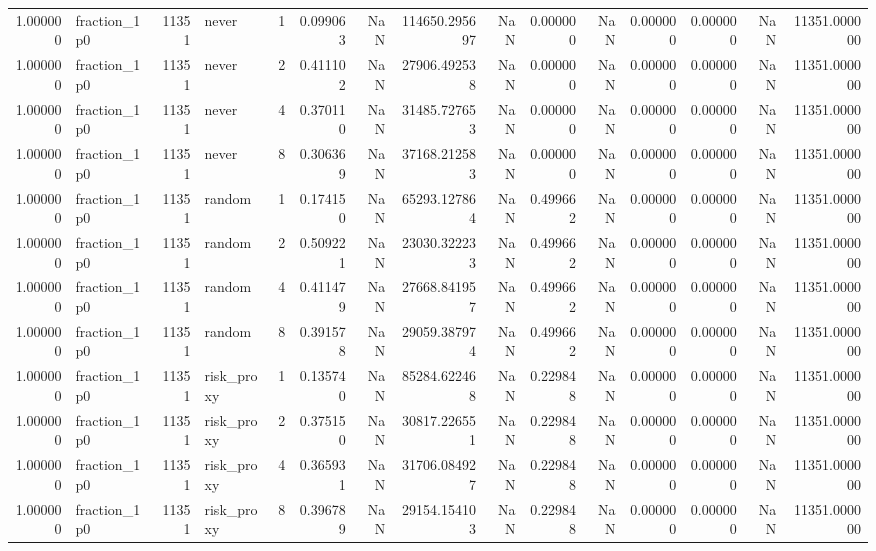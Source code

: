 \begin{tabular}{rlrlrrrrrrrrrrr}
1.000000 & fraction\_1p0 & 11351 & never & 1 & 0.099063 & NaN & 114650.295697 & NaN & 0.000000 & NaN & 0.000000 & 0.000000 & NaN & 11351.000000 \\
1.000000 & fraction\_1p0 & 11351 & never & 2 & 0.411102 & NaN & 27906.492538 & NaN & 0.000000 & NaN & 0.000000 & 0.000000 & NaN & 11351.000000 \\
1.000000 & fraction\_1p0 & 11351 & never & 4 & 0.370110 & NaN & 31485.727653 & NaN & 0.000000 & NaN & 0.000000 & 0.000000 & NaN & 11351.000000 \\
1.000000 & fraction\_1p0 & 11351 & never & 8 & 0.306369 & NaN & 37168.212583 & NaN & 0.000000 & NaN & 0.000000 & 0.000000 & NaN & 11351.000000 \\
1.000000 & fraction\_1p0 & 11351 & random & 1 & 0.174150 & NaN & 65293.127864 & NaN & 0.499662 & NaN & 0.000000 & 0.000000 & NaN & 11351.000000 \\
1.000000 & fraction\_1p0 & 11351 & random & 2 & 0.509221 & NaN & 23030.322233 & NaN & 0.499662 & NaN & 0.000000 & 0.000000 & NaN & 11351.000000 \\
1.000000 & fraction\_1p0 & 11351 & random & 4 & 0.411479 & NaN & 27668.841957 & NaN & 0.499662 & NaN & 0.000000 & 0.000000 & NaN & 11351.000000 \\
1.000000 & fraction\_1p0 & 11351 & random & 8 & 0.391578 & NaN & 29059.387974 & NaN & 0.499662 & NaN & 0.000000 & 0.000000 & NaN & 11351.000000 \\
1.000000 & fraction\_1p0 & 11351 & risk\_proxy & 1 & 0.135740 & NaN & 85284.622468 & NaN & 0.229848 & NaN & 0.000000 & 0.000000 & NaN & 11351.000000 \\
1.000000 & fraction\_1p0 & 11351 & risk\_proxy & 2 & 0.375150 & NaN & 30817.226551 & NaN & 0.229848 & NaN & 0.000000 & 0.000000 & NaN & 11351.000000 \\
1.000000 & fraction\_1p0 & 11351 & risk\_proxy & 4 & 0.365931 & NaN & 31706.084927 & NaN & 0.229848 & NaN & 0.000000 & 0.000000 & NaN & 11351.000000 \\
1.000000 & fraction\_1p0 & 11351 & risk\_proxy & 8 & 0.396789 & NaN & 29154.154103 & NaN & 0.229848 & NaN & 0.000000 & 0.000000 & NaN & 11351.000000 \\
\bottomrule
\end{tabular}
